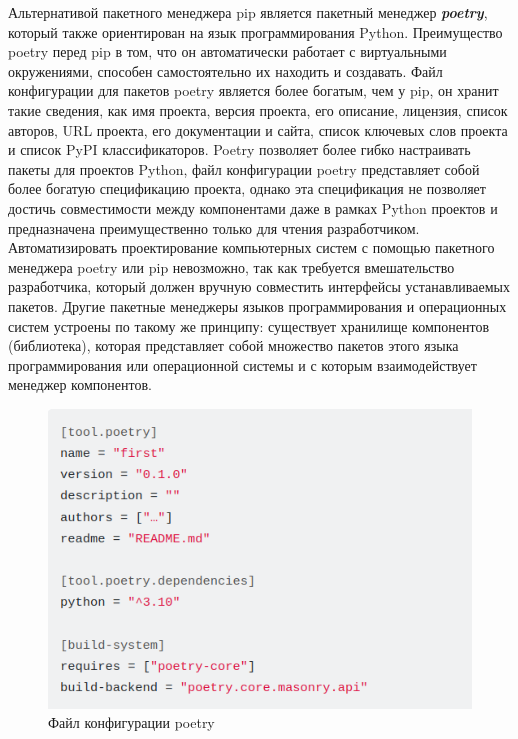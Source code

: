 Альтернативой пакетного менеджера pip является пакетный менеджер \textbf{\textit{poetry}}, который также ориентирован на язык программирования Python. Преимущество poetry перед pip в том, что он автоматически работает с виртуальными окружениями, способен самостоятельно их находить и создавать. Файл конфигурации для пакетов poetry является более богатым, чем у pip, он хранит такие сведения, как имя проекта, версия проекта, его описание, лицензия, список авторов, URL проекта, его документации и сайта, список ключевых слов проекта и список PyPI классификаторов. Poetry позволяет более гибко настраивать пакеты для проектов Python, файл конфигурации poetry представляет собой более богатую спецификацию проекта, однако эта спецификация не позволяет достичь совместимости между компонентами даже в рамках Python проектов и предназначена преимущественно только для чтения разработчиком. Автоматизировать проектирование компьютерных систем с помощью пакетного менеджера poetry или pip невозможно, так как требуется вмешательство разработчика, который должен вручную совместить интерфейсы устанавливаемых пакетов. Другие пакетные менеджеры языков программирования и операционных систем устроены по такому же принципу: существует хранилище компонентов (библиотека), которая представляет собой множество пакетов этого языка программирования или операционной системы и с которым взаимодействует менеджер компонентов.

\begin{figure}[H]
	\includegraphics[scale=0.7]{author/part5/figures/poetry.png}
	\caption{Файл конфигурации poetry}
	\label{fig:poetry}
\end{figure}

